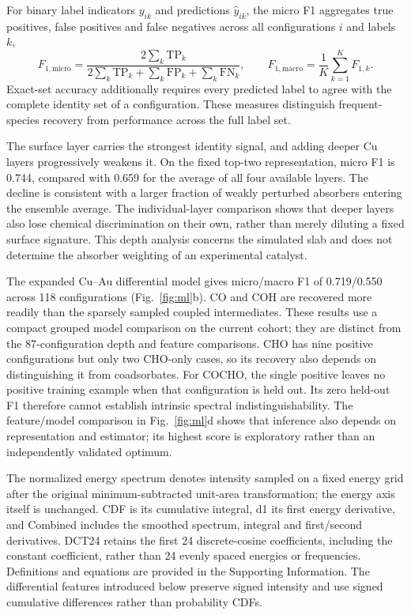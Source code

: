 \documentclass[11pt,a4paper]{article}
\begin{document}
For binary label indicators $y_{ik}$ and predictions $\hat y_{ik}$, the micro F1 aggregates true positives, false positives and false negatives across all configurations $i$ and labels $k$,
\begin{equation}
F_{1,\mathrm{micro}}=\frac{2\sum_k\mathrm{TP}_k}{2\sum_k\mathrm{TP}_k+\sum_k\mathrm{FP}_k+\sum_k\mathrm{FN}_k},
\qquad F_{1,\mathrm{macro}}=\frac{1}{K}\sum_{k=1}^{K}F_{1,k}.
\end{equation}
Exact-set accuracy additionally requires every predicted label to agree with the complete identity set of a configuration. These measures distinguish frequent-species recovery from performance across the full label set.

The surface layer carries the strongest identity signal, and adding deeper Cu layers progressively weakens it. On the fixed top-two representation, micro F1 is 0.744, compared with 0.659 for the average of all four available layers. The decline is consistent with a larger fraction of weakly perturbed absorbers entering the ensemble average. The individual-layer comparison shows that deeper layers also lose chemical discrimination on their own, rather than merely diluting a fixed surface signature. This depth analysis concerns the simulated slab and does not determine the absorber weighting of an experimental catalyst.

The expanded Cu--Au differential model gives micro/macro F1 of 0.719/0.550 across 118 configurations (Fig.~\ref{fig:ml}b). CO and COH are recovered more readily than the sparsely sampled coupled intermediates. These results use a compact grouped model comparison on the current cohort; they are distinct from the 87-configuration depth and feature comparisons. CHO has nine positive configurations but only two CHO-only cases, so its recovery also depends on distinguishing it from coadsorbates. For COCHO, the single positive leaves no positive training example when that configuration is held out. Its zero held-out F1 therefore cannot establish intrinsic spectral indistinguishability. The feature/model comparison in Fig.~\ref{fig:ml}d shows that inference also depends on representation and estimator; its highest score is exploratory rather than an independently validated optimum.

The normalized energy spectrum denotes intensity sampled on a fixed energy grid after the original minimum-subtracted unit-area transformation; the energy axis itself is unchanged. CDF is its cumulative integral, d1 its first energy derivative, and Combined includes the smoothed spectrum, integral and first/second derivatives. DCT24 retains the first 24 discrete-cosine coefficients, including the constant coefficient,\cite{ahmed1974} rather than 24 evenly spaced energies or frequencies. Definitions and equations are provided in the Supporting Information. The differential features introduced below preserve signed intensity and use signed cumulative differences rather than probability CDFs.
\end{document}

